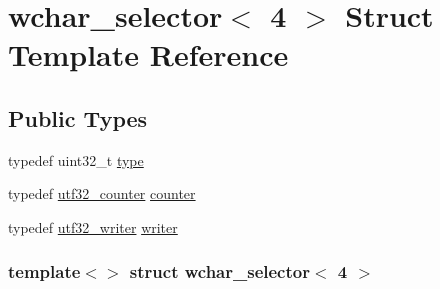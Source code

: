\hypertarget{structwchar__selector_3_014_01_4}{
\section{wchar\_\-selector$<$ 4 $>$ Struct Template Reference}
\label{structwchar__selector_3_014_01_4}
}
\subsection*{Public Types}
\begin{DoxyCompactItemize}
\item 
typedef uint32\_\-t \hyperlink{structwchar__selector_3_014_01_4_af45ac603ab6fefec66e5c29044b4eed6}{type}
\item 
typedef \hyperlink{structutf32__counter}{utf32\_\-counter} \hyperlink{structwchar__selector_3_014_01_4_a7d7c585ae0819660112b8c8683971b97}{counter}
\item 
typedef \hyperlink{structutf32__writer}{utf32\_\-writer} \hyperlink{structwchar__selector_3_014_01_4_a48042e7fe51c4661397ae7afe3905243}{writer}
\end{DoxyCompactItemize}
\subsubsection*{template$<$$>$ struct wchar\_\-selector$<$ 4 $>$}



